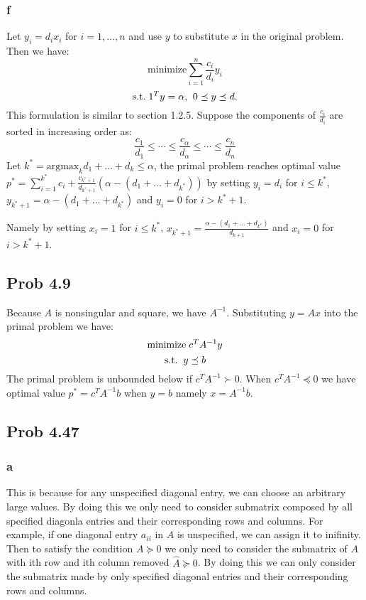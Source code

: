 \documentclass[10pt,a4paper]{article}
\begin{document}
\subsubsection{f}
Let $y_i=d_ix_i$ for $i=1,\dots,n$ and use $y$ to substitute
$x$ in the original problem. Then we have:
$$
\text{minimize} \sum_{i=1}^n \frac{c_i}{d_i}y_i
$$
$$
\text{s.t.\;} 1^Ty=\alpha\text{,\;\;} 0\preceq y \preceq d.
$$
This formulation is similar to section 1.2.5. Suppose the
components of $\frac{c_i}{d_i}$ are sorted in increasing
order as:
$$
\frac{c_1}{d_1}\leq \dotsb \leq \frac{c_\alpha}{d_\alpha} \leq \dotsb \leq\frac{c_n}{d_n} 
$$
Let $k^*=\text{argmax}_kd_1+\dots+d_k\leq \alpha$, the primal problem reaches
optimal value
$p^*=\sum_{i=1}^{k^*}c_i+\frac{c_{k^*+1}}{d_{k^*+1}}(\alpha-(d_1+\dots+d_{k^*}))$
by setting $y_i=d_i$ for $i\leq k^*$, $y_{k^*+1}=\alpha-(d_1+\dots+d_{k^*})$ and
$y_i=0$ for $i>k^*+1$.

Namely by setting $x_i=1$ for $i\leq k^*$, $x_{k^*+1}=\frac{\alpha-(d_1+\dots+d_{k^*})}{d_{k+1}}$ and
$x_i=0$ for $i>k^*+1$.


\subsection{Prob 4.9}
Because $A$ is nonsingular and square, we have $A^{-1}$. Substituting
$y=Ax$ into the primal problem we have:
$$
\text{minimize\;} c^TA^{-1}y
$$
$$
\text{s.t.\;\;} y\preceq b
$$
The primal problem is unbounded below if $c^TA^{-1}\succ0$.
When $c^TA^{-1}\preceq 0$ we have optimal value
$p^*=c^TA^{-1}b$ when $y=b$ namely $x=A^{-1}b$.

\subsection{Prob 4.47}

\subsubsection{a}
This is because for any unspecified diagonal entry, we can
choose an arbitrary large values. By doing this we only need
to consider submatrix composed by all specified diagonla
entries and their corresponding rows and columns. For
example, if one diagonal entry $a_{ii}$ in $A$ is
unspecified, we can assign it to inifinity. Then to satisfy
the condition $A\succeq0$ we only need to consider the
submatrix of $A$ with ith row and ith column removed
$\hat{A}\succeq0$. By doing this we can only consider the
submatrix made by only specified diagonal entries and their
corresponding rows and columns. 
\end{document}
